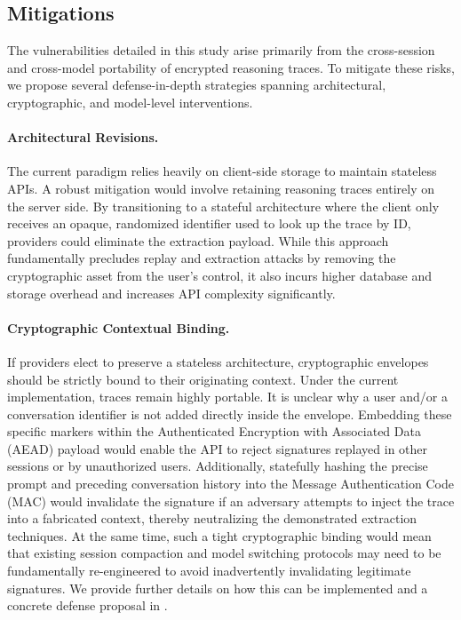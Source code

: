 \subsection{Mitigations}

The vulnerabilities detailed in this study arise primarily from the cross-session and cross-model portability of encrypted reasoning traces. To mitigate these risks, we propose several defense-in-depth strategies spanning architectural, cryptographic, and model-level interventions.

\paragraph{Architectural Revisions.} The current paradigm relies heavily on client-side storage to maintain stateless APIs. A robust mitigation would involve retaining reasoning traces entirely on the server side. By transitioning to a stateful architecture where the client only receives an opaque, randomized identifier used to look up the trace by ID, providers could eliminate the extraction payload. While this approach fundamentally precludes replay and extraction attacks by removing the cryptographic asset from the user's control, it also incurs higher database and storage overhead and increases API complexity significantly. 

\paragraph{Cryptographic Contextual Binding.} If providers elect to preserve a stateless architecture, cryptographic envelopes should be strictly bound to their originating context. Under the current implementation, traces remain highly portable. It is unclear why a user and/or a conversation identifier is not added directly inside the envelope. Embedding these specific markers within the Authenticated Encryption with Associated Data (AEAD) payload would enable the API to reject signatures replayed in other sessions or by unauthorized users. Additionally, statefully hashing the precise prompt and preceding conversation history into the Message Authentication Code (MAC) would invalidate the signature if an adversary attempts to inject the trace into a fabricated context, thereby neutralizing the demonstrated extraction techniques. At the same time, such a tight cryptographic binding would mean that existing session compaction and model switching protocols may need to be fundamentally re-engineered to avoid inadvertently invalidating legitimate signatures. We provide further details on how this can be implemented and a concrete defense proposal in .


